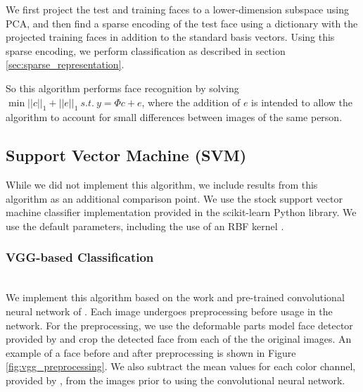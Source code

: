 \documentclass[pageno]{cos429}
\begin{document}
We first project the test and training faces to a lower-dimension subspace using PCA, and then find a sparse encoding of the test face using a dictionary with the projected training faces in addition to the standard basis vectors. Using this sparse encoding, we perform classification as described in section \ref{sec:sparse_representation}.

So this algorithm performs face recognition by solving $\min||c||_1+||e||_1\:s.t.\:y=\Phi c+e$, where the addition of $e$ is intended to allow the algorithm to account for small differences between images of the same person.

\subsection{Support Vector Machine (SVM)}
While we did not implement this algorithm, we include results from this algorithm as an additional comparison point. We use the stock support vector machine classifier implementation provided in the scikit-learn Python library. We use the default parameters, including the use of an RBF kernel \cite{scikit-learn}.

\subsubsection{VGG-based Classification}\hspace*{\fill} \\
We implement this algorithm based on the work and pre-trained convolutional neural network of \cite{parkhi_deep_2015}. Each image undergoes preprocessing before usage in the network. For the preprocessing, we use the deformable parts model face detector provided by \cite{parkhi_deep_2015} and crop the detected face from each of the the original images. An example of a face before and after preprocessing is shown in Figure \ref{fig:vgg_preprocessing}. We also subtract the mean values for each color channel, provided by \cite{parkhi_deep_2015}, from the images prior to using the convolutional neural network.
\end{document}
